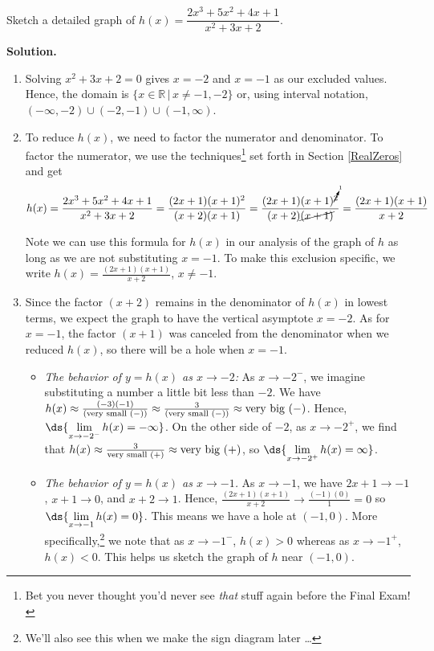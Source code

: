 \documentclass{ximera}
\begin{document}
\begin{example}  Sketch a detailed graph of $h(x) = \dfrac{2x^3+5x^2+4x+1}{x^2+3x+2}$.

{ \bf Solution.}  

\begin{enumerate}

\item   Solving $x^2+3x+2 = 0$ gives $x = -2$ and $x=-1$ as our excluded values.  Hence, the domain is $\{ x \in \mathbb{R} \, | \, x \neq -1, -2 \}$ or, using interval notation,  $(-\infty, -2) \cup (-2, -1) \cup (-1, \infty)$.

\item  To reduce $h(x)$, we need to factor the numerator and denominator.  To factor the numerator, we use the techniques\footnote{Bet you never thought you'd never see \textit{that} stuff again before the Final Exam!} set forth in Section \ref{RealZeros} and get  \[h(x) =  \dfrac{2x^3+5x^2+4x+1}{x^2+3x+2} = \dfrac{(2x+1)(x+1)^2}{(x+2)(x+1)} = \dfrac{ (2x+1) (x+1)^{\cancelto{1}{2}}  }{(x+2)\cancel{(x+1)}} = \dfrac{(2x+1)(x+1)}{x+2} \]

Note we can use this formula for $h(x)$ in our analysis of the graph of $h$ as long as we are not substituting $x=-1$.  To make this exclusion specific, we write $h(x) = \frac{(2x+1)(x+1)}{x+2}$, $x \neq -1$.

\item  Since the factor $(x+2)$ remains in the denominator of $h(x)$ in lowest terms, we expect the graph to have the vertical asymptote $x=-2$.  As for $x=-1$, the factor $(x+1)$ was canceled from the denominator when we reduced $h(x)$, so there will be a hole when $x=-1$.   

\begin{itemize}

\item  \textit{The behavior of $y=h(x)$ as $x \rightarrow -2$:}  As $x \rightarrow -2^{-}$, we imagine substituting a number a little bit less than $-2$. We have $h(x) \approx \frac{(-3)(-1)}{(\text{\scriptsize very small $(-)$})} \approx \frac{3}{(\text{\scriptsize very small $(-)$})}\approx \text{very big $(-)$}$.  Hence,  $\ds{\lim_{x \rightarrow -2^{-}} h(x) = - \infty}$.  On the other side of $-2$, as $x \rightarrow -2^{+}$, we find that $h(x) \approx \frac{3}{\text{\scriptsize very small $(+)$}} \approx \text{very big $(+)$}$, so  $\ds{\lim_{x \rightarrow -2^{+}} h(x) =  \infty}$.

\item  \textit{The behavior of $y=h(x)$ as $x \rightarrow -1$.}    As $x \rightarrow -1$, we have $2x+1 \rightarrow -1$, $x+1 \rightarrow 0$, and $x+2 \rightarrow 1$.  Hence, $\frac{(2x+1)(x+1)}{x+2} \rightarrow \frac{(-1)(0)}{1} = 0$ so $\ds{\lim_{x \rightarrow -1} h(x) = 0}$.  This means we have a hole at $(-1,0)$.  More specifically,\footnote{We'll also see this  when we make the sign diagram later \ldots} we note that as $x \rightarrow -1^{-}$,  $h(x) > 0$ whereas as $x \rightarrow -1^{+}$, $h(x) < 0$. This helps us sketch the graph of $h$ near $(-1,0)$.


\end{itemize}
\end{enumerate}
\end{example}
\end{document}
